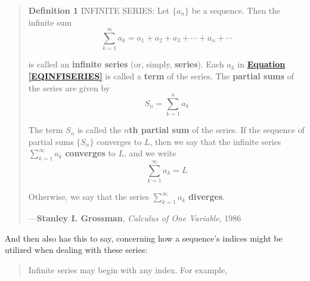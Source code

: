 \documentclass[a4paper, 18pt]{book} %
\begin{document}
\begin{appendices}
\begin{minipage}{1\textwidth}
\begin{quotation}
{\textbf{Definition 1} INFINITE SERIES: Let $\{a_n\}$ be a sequence. Then the infinite sum\\

\begin{equation}
\label{EQINFISERIES}
\sum\limits^\infty_{k=1} a_k = a_1 + a_2 + a_3 + \cdots + a_n + \cdots
\end{equation}

is called an \textbf{infinite series} (or, simply, \textbf{series}). Each $a_k$ in \textbf{\hyperref[EQINFISERIES]{Equation \ref{EQINFISERIES}}} is called a \textbf{term} of the series. The \textbf{partial sums} of the series are given by\\

\begin{equation}
S_n = \sum\limits^n_{k=1} a_k
\end{equation}


The term $S_n$ is called the \textbf{$n$th partial sum} of the series. If the sequence of partial sums $\{S_n\}$ converges to $L$, then we say that the infinite series $\sum\limits^\infty_{k=1} a_k$ \textbf{converges} to $L$, and we write\\

\begin{equation}
\sum\limits^\infty_{k=1} a_k = L
\end{equation}

Otherwise, we say that the series  $\sum\limits^\infty_{k=1} a_k$ \textbf{diverges}.

}
\hspace*{\fill} ---\textbf{Stanley I. Grossman}, \textit{Calculus of One Variable}, 1986\cite{Grossman1986CalculusOneVariable}
\end{quotation}
\vspace{1em}
\end{minipage}

\vspace{2em}


And then \cite{ronlarsoncalculus} also has this to say, concerning how a sequence's indices might be utilized when dealing with these series:


\vspace{2em}

\noindent
\begin{minipage}{1\textwidth}
\vspace{1em}
\begin{quotation}
{\ttfamily

Infinite series may begin with any index. For example,\\

}
\end{quotation}
\end{minipage}
\end{appendices}
\end{document}
